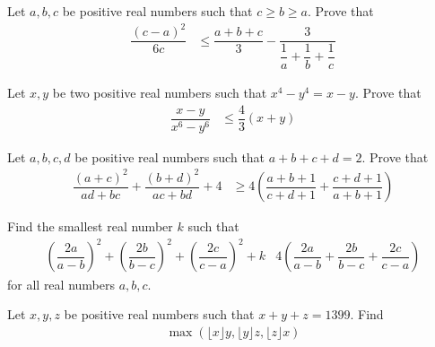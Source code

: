 \documentclass[inequalities.tex]{subfile}
\begin{document}
		\begin{problem}
			Let $a,b,c$ be positive real numbers such that $c\geq b\geq a$. Prove that
				\begin{align*}
					\dfrac{(c-a)^{2}}{6c}
						& \leq \dfrac{a+b+c}{3}-\dfrac{3}{\dfrac{1}{a}+\dfrac{1}{b}+\dfrac{1}{c}}
				\end{align*}
		\end{problem}
	
		\begin{problem}
			Let $x,y$ be two positive real numbers such that $x^{4}-y^{4}=x-y$. Prove that
				\begin{align*}
					\dfrac{x-y}{x^{6}-y^{6}}
						& \leq \dfrac{4}{3}(x+y)
				\end{align*}
		\end{problem}
	
		\begin{problem}
			Let $a,b,c,d$ be positive real numbers such that $a+b+c+d=2$. Prove that
				\begin{align*}
					\dfrac{(a+c)^{2}}{ad+bc}+\dfrac{(b+d)^{2}}{ac+bd}+4
						& \geq 4\left(\dfrac{a+b+1}{c+d+1}+\dfrac{c+d+1}{a+b+1}\right)
				\end{align*}
		\end{problem}
	
		\begin{problem}
			Find the smallest real number $k$ such that
				\begin{align*}
					\left(\dfrac{2a}{a-b}\right)^{2}+\left(\dfrac{2b}{b-c}\right)^{2}+\left(\dfrac{2c}{c-a}\right)^{2}+k
						& 4\left(\dfrac{2a}{a-b}+\dfrac{2b}{b-c}+\dfrac{2c}{c-a}\right)
				\end{align*}
			for all real numbers $a,b,c$.
		\end{problem}
	
		\begin{problem}
			Let $x,y,z$ be positive real numbers such that $x+y+z=1399$. Find
				\begin{align*}
					\max\left(\lfloor x\rfloor y,\lfloor y\rfloor z,\lfloor z\rfloor x\right)
				\end{align*}
		\end{problem}
\end{document}
